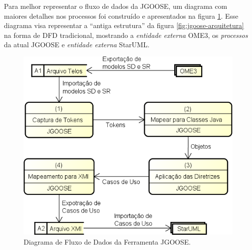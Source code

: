             Para melhor representar o fluxo de dados da JGOOSE, um diagrama com maiores detalhes nos processos foi construído e apresentados na figura \ref{fig:dfd-detail-1}.
            Esse diagrama visa representar a ``antiga estrutura'' da figura \ref{fig:jgoose-arquitetura} na forma de DFD tradicional, mostrando a \emph{entidade externa} OME3, os \emph{processos} da atual JGOOSE e \emph{entidade externa} StarUML.

            \begin{figure}[h!]
                \centering
                    \includegraphics[scale=0.8]{Figuras/dfd-detail-1.png}
                    \caption{Diagrama de Fluxo de Dados da Ferramenta JGOOSE.}
                    \label{fig:dfd-detail-1}
            \end{figure}

